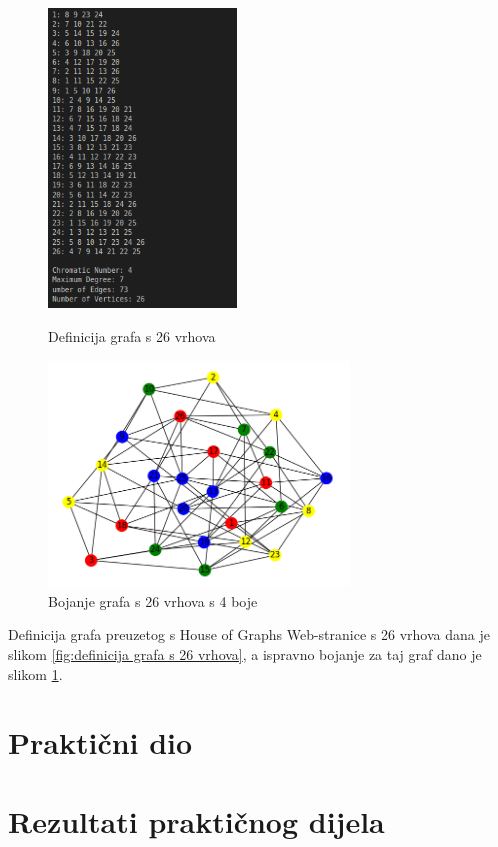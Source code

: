 \documentclass[times, utf8, zavrsni]{fer}
\begin{document}
\begin{figure}[h]
\centering
\begin{minipage}{.5\textwidth}
  \centering
  \includegraphics[width=5cm]{images/26_vertices_graph_definition.png}
  \caption{Definicija grafa s 26 vrhova}
  \label{fig:definicija grafa s 26 vrhova}
\end{minipage}%
\begin{minipage}{.5\textwidth}
  \centering
  \includegraphics[width=8cm]{images/26_vertices_graph.png}
  \caption{Bojanje grafa s 26 vrhova s 4 boje}
  \label{fig:obojani graf s 26 vrhova}
\end{minipage}
\end{figure}

Definicija grafa preuzetog s House of Graphs Web-stranice s 26 vrhova dana je slikom \ref{fig:definicija grafa s 26 vrhova}, a ispravno bojanje za taj graf dano je slikom \ref{fig:obojani graf s 26 vrhova}.


\chapter{Praktični dio}

\chapter{Rezultati praktičnog dijela}
\end{document}
